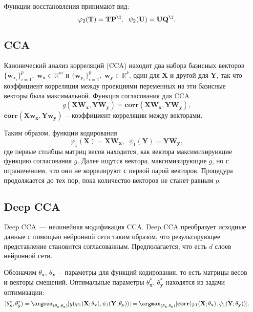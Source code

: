 \documentclass[12pt, twoside]{article}
\newcommand{\bx}{\mathbf{x}}
\newcommand{\by}{\mathbf{y}}
\newcommand{\bw}{\mathbf{w}}
\newcommand{\bY}{\mathbf{Y}}
\newcommand{\bX}{\mathbf{X}}
\newcommand{\bP}{\mathbf{P}}
\newcommand{\bT}{\mathbf{T}}
\newcommand{\bQ}{\mathbf{Q}}
\newcommand{\bU}{\mathbf{U}}
\newcommand{\bW}{\mathbf{W}}
\begin{document}
\noindent Функции восстановления принимают вид:
\begin{equation}
\varphi_2(\bT) = \bT\bP^{\T}, \;\;
\psi_2(\bU) = \bU \bQ^{\T}.
\end{equation} 

\subsection{CCA}

Канонический анализ корреляций (CCA) находит два набора базисных векторов $\{\bw_{\bx}_{i}\}_{i=1}^{p}, \; \bw_{\bx} \in \mathbb{R}^{m}$ и $\{\bw_{\by}_{i}\}_{i=1}^{p}, \; \bw_{\by} \in \mathbb{R}^{k}$, один для $\bX$ и другой для $\bY$, так что коэффициент корреляция между проекциями переменных на эти базисные векторы была максимальной. Функция согласования для CCA
\begin{equation}
g(\bX \bW_{\bx}, \bY \bW_{\by}) = \textbf{corr}(\bX \bW_{\bx}, \bY \bW_{\by}),
\end{equation} 
 $\textbf{corr}(\bX \bw_{\bx}, \bY \bw_{\by})$~-- коэффициент корреляции между векторами.

\noindent Таким образом, функции кодирования
\begin{equation}
\varphi_1(\bX) = \bX \bW_{\bx} , \;\;
\psi_1(\bY) = \bY \bW_{\by},
\end{equation}
где первые столбцы матриц весов находится, как вектора максимизирующие функцию согласования $g$. Далее ищутся вектора, максимизирующие $g$, но с ограничением, что они не коррелируют с первой парой векторов. Процедура продолжается до тех пор, пока количество векторов не станет равным $p$. 
\subsection{Deep CCA}

Deep CCA~--- нелинейная модификация CCA. Deep CCA преобразует исходные данные с помощью нейронной сети таким образом, что результирующее представление становится согласованным. Предполагается, что есть $d$ слоев нейронной сети. 

Обозначим $\theta_{\bx}$, $\theta_{\by}$~-- параметры для функций кодирования, то есть матрицы весов и векторы смещений. Оптимальные параметры $\theta_{\bx}^{*}$, $\theta_{\by}^{*}$ находятся из задачи оптимизации:
\begin{equation}
(\theta_{\bx}^{*}, \theta_{\by}^{*}) = \argmax _{(\theta_{\bx}, \theta_{\by})} [g(\varphi_1(\bX; \theta_{\bx}), \psi_1(\bY; \theta_{\by}))] = \argmax _{(\theta_{\bx}, \theta_{\by})} [\textbf{corr}(\varphi_1(\bX; \theta_{\bx}), \psi_1(\bY; \theta_{\by}))].
\end{equation}
\end{document}

